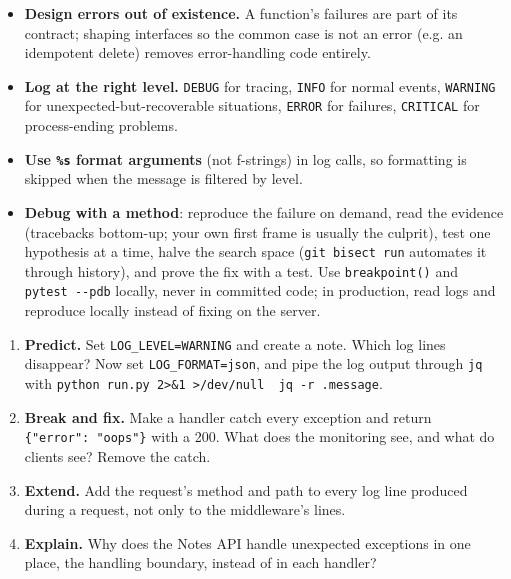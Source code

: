 \begin{takeaways}
\begin{itemize}
\item
  \textbf{Design errors out of existence.} A function's failures are part of its contract; shaping interfaces so the common case is not an error (e.g. an idempotent delete) removes error-handling code entirely.
\item
  \textbf{Log at the right level.} \texttt{DEBUG} for tracing, \texttt{INFO} for normal events, \texttt{WARNING} for unexpected-but-recoverable situations, \texttt{ERROR} for failures, \texttt{CRITICAL} for process-ending problems.
\item
  \textbf{Use \texttt{\%s} format arguments} (not f-strings) in log calls, so formatting is skipped when the message is filtered by level.
\item
  \textbf{Debug with a method}: reproduce the failure on demand, read the evidence (tracebacks bottom-up; your own first frame is usually the culprit), test one hypothesis at a time, halve the search space (\texttt{git\ bisect\ run} automates it through history), and prove the fix with a test. Use \texttt{breakpoint()} and \texttt{pytest\ -\/-pdb} locally, never in committed code; in production, read logs and reproduce locally instead of fixing on the server.
\end{itemize}

\end{takeaways}

\label{16-logging-error-handling:exercises}

\begin{enumerate}
\def\labelenumi{\arabic{enumi}.}
\tightlist
\item
  \textbf{Predict.} Set \texttt{LOG\_LEVEL=WARNING} and create a note. Which log lines disappear? Now set \texttt{LOG\_FORMAT=json}, and pipe the log output through \texttt{jq} with \texttt{python\ run.}\allowbreak{}\texttt{py\ 2\textgreater{}\&}\allowbreak{}\texttt{1\ \textgreater{}/}\allowbreak{}\texttt{dev/}\allowbreak{}\texttt{null\ \textbar{}\ jq\ -}\allowbreak{}\texttt{r\ .}\allowbreak{}\texttt{message}.
\item
  \textbf{Break and fix.} Make a handler catch every exception and return \texttt{\{"error":\ "oops"\}} with a 200. What does the monitoring see, and what do clients see? Remove the catch.
\item
  \textbf{Extend.} Add the request's method and path to every log line produced during a request, not only to the middleware's lines.
\item
  \textbf{Explain.} Why does the Notes API handle unexpected exceptions in one place, the handling boundary, instead of in each handler?
\end{enumerate}

